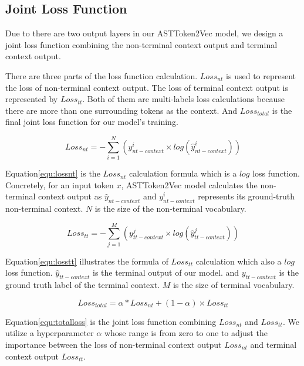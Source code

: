 \documentclass[T, E]{compsoft}
\begin{document}
\subsection{Joint Loss Function}
Due to there are two output layers in our ASTToken2Vec model, we design a joint loss function combining the non-terminal context output and terminal context output. 

There are three parts of the loss function calculation. 
$Loss_{nt}$ is used to represent the loss of non-terminal context output. 
The loss of terminal context output is represented by $Loss_{tt}$. 
Both of them are multi-labels loss calculations because there are more than one surrounding tokens as the context. 
And $Loss_{total}$ is the final joint loss function for our model's training.

\begin{equation}
Loss_{nt} = -\sum_{i=1}^{N}(y_{nt-context}^{i} \times log(\hat{y}_{nt-context}^{i}))\label{equ:lossnt}
\end{equation}

Equation\ref{equ:lossnt} is the $Loss_{nt}$ calculation formula which is a $log$ loss function. 
Concretely, for an input token $x$, ASTToken2Vec model calculates the non-terminal context output as $\hat{y}_{nt-context}$ and $y_{nt-context}^{i}$ represents its ground-truth non-terminal context.
$N$ is the size of the non-terminal vocabulary. 


\begin{equation}
Loss_{tt} = -\sum_{j=1}^{M} (y_{tt-context}^{j} \times log(\hat{y}_{tt-context}^{j}))\label{equ:losstt}
\end{equation}

Equation\ref{equ:losstt} illustrates the formula of $Loss_{tt}$ calculation which also a $log$ loss function. 
$\hat{y}_{tt-context}$ is the terminal output of our model. and $y_{tt-context}$ is the ground truth label of the terminal context.
$M$ is the size of terminal vocabulary.

\begin{equation}
Loss_{total} = \alpha * Loss_{nt} + (1-\alpha) \times Loss_{tt}\label{equ:totalloss}
\end{equation}

Equation\ref{equ:totalloss} is the joint loss function combining $Loss_{nt}$ and $Loss_{tt}$. 
We utilize a hyperparameter $\alpha$ whose range is from zero to one to adjust the importance between the loss of non-terminal context output $Loss_{nt}$ and terminal context output $Loss_{tt}$.
\end{document}

